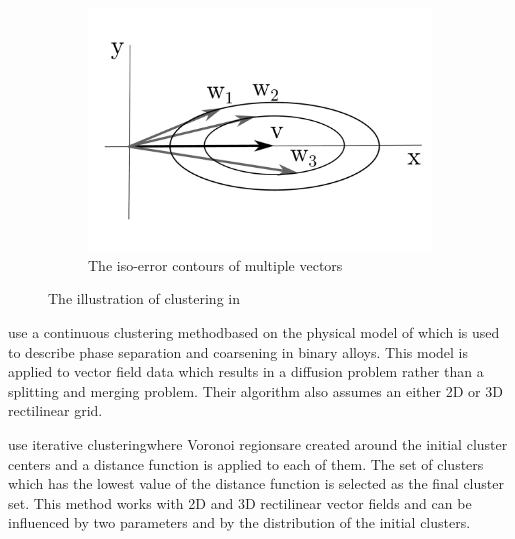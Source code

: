 \begin{figure}[h]
\begin{subfigure}{0.4\textwidth}
    	\includegraphics[width=\textwidth]{./illustrations/telea-ellipse_contours-embedded_font.pdf}
    	\caption{The iso-error contours of multiple vectors}
	\end{subfigure}
\caption[The illustration of clustering in \citet{Telea99}]{The illustration of clustering in \citet{Telea99}}
\label{fig:illustration-telea_hierarchical_clustering}
\end{figure}

\citet{Garcke00} use a continuous clustering method\footnotemark based on the physical model of \citet{CahnHilliard58} which is used to describe phase separation and coarsening in binary alloys. This model is applied to vector field data which results in a diffusion problem rather than a splitting and merging problem. Their algorithm also assumes an either 2D or 3D rectilinear grid.


\citet{Du04} use iterative clustering\footnotemark where Voronoi regions\footnotemark are created around the initial cluster centers and a distance function is applied to each of them. The set of clusters which has the lowest value of the distance function is selected as the final cluster set. This method works with 2D and 3D rectilinear vector fields and can be influenced by two parameters and by the distribution of the initial clusters.

\addtocounter{footnote}{-2}

